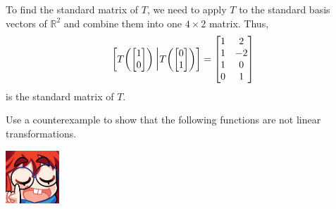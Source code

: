\documentclass{article}
\begin{document}
\begin{enumerate}
\begin{solution}
        To find the standard matrix of \(T\), we need to apply \(T\) to the standard basis vectors of \(\mathbb{R}^2\) and combine them into one \(4\times 2\) matrix. Thus,\[
            \begin{bmatrix}
                T\!\begin{pmatrix}
                    \begin{bmatrix}
                        1\\0
                    \end{bmatrix}
                \end{pmatrix}\scalebox{1.3}{\Big|}T\!\begin{pmatrix}
                    \begin{bmatrix}
                        0\\1
                    \end{bmatrix}
                \end{pmatrix} 
            \end{bmatrix} = \begin{bmatrix}
                1&2\\1&-2\\1&0\\0&1
            \end{bmatrix}
        \] is the standard matrix of \(T\).
    \end{solution}
\end{enumerate}
\begin{center}
    \colorbox{CornflowerBlue!50}{
    \begin{minipage}[c]{0.9\textwidth}
        \centering
        Use a counterexample to show that the following functions are not linear transformations. 
    \end{minipage}
    }
\end{center}
\begin{minipage}{.14\textwidth}
    \vspace{0pt}
    \includegraphics[width=2cm]{nerd_maddy.png}
\end{minipage}%
\end{document}
